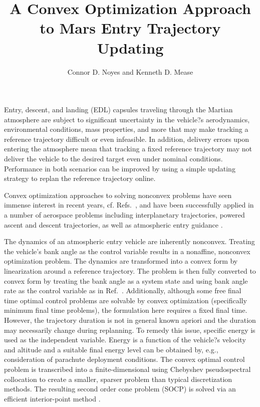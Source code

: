 \documentclass[10pt,a4paper]{article}
\author{Connor D. Noyes and Kenneth D. Mease}
\title{A Convex Optimization Approach to Mars Entry Trajectory Updating}
\begin{document}
	\maketitle

	\section*{}
	Entry, descent, and landing (EDL) capsules traveling through the Martian atmosphere are subject to significant uncertainty in the vehicle?s aerodynamics, environmental conditions, mass properties, and more that may make tracking a reference trajectory difficult or even infeasible. In addition, delivery errors upon entering the atmosphere mean that tracking a fixed reference trajectory may not deliver the vehicle to the desired target even under nominal conditions. Performance in both scenarios can be improved by using a simple updating strategy to replan the reference trajectory online.
	
	Convex optimization approaches to solving nonconvex problems have seen immense interest in recent years, cf. Refs.~\cite{SeqConProg,SuccConvex1,SuccConvex2}, and have been successfully applied in a number of aerospace problems including interplanetary trajectories, powered ascent \cite{PS_Convex_ascent} and descent \cite{Convex_descent} trajectories, as well as atmospheric entry guidance \cite{WangConvexTraj}. 
	
	The dynamics of an atmospheric entry vehicle are inherently nonconvex. Treating the vehicle's bank angle as the control variable results in a nonaffine, nonconvex optimization problem. The dynamics are transformed into a convex form by linearization around a reference trajectory. The problem is then fully converted to convex form by treating the bank angle as a system state and using bank angle rate as the control variable as in Ref.~\cite{WangConvexTraj}. Additionally, although some free final time optimal control problems are solvable by convex optimization (specifically minimum final time problems), the formulation here requires a fixed final time. However, the trajectory duration is not in general known apriori and the duration may necessarily change during replanning. To remedy this issue, specific energy is used as the independent variable. Energy is a function of the vehicle?s velocity and altitude and a suitable final energy level can be obtained by, e.g., consideration of parachute deployment conditions. The convex optimal control problem is transcribed into a finite-dimensional using Chebyshev pseudospectral collocation \cite{ChebyPS} to create a smaller, sparser problem than typical discretization methods. The resulting second order cone problem (SOCP) is solved via an efficient interior-point method \cite{BoydConvexBook}.
	
\end{document}
